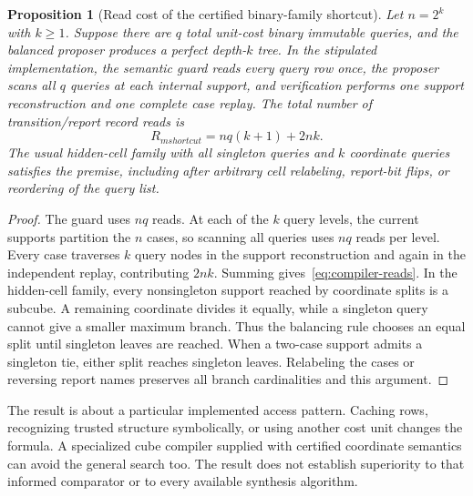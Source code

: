 \documentclass[11pt,letterpaper]{article}
\theoremstyle{plain}
\newtheorem{proposition}[theorem]{Proposition}
\theoremstyle{definition}
\begin{document}
\begin{proposition}[Read cost of the certified binary-family shortcut]\label{prop:compiler-work}
Let $n=2^k$ with $k\geq1$. Suppose there are $q$ total unit-cost binary immutable queries, and the balanced proposer produces a perfect depth-$k$ tree. In the stipulated implementation, the semantic guard reads every query row once, the proposer scans all $q$ queries at each internal support, and verification performs one support reconstruction and one complete case replay. The total number of transition/report record reads is
\begin{equation}\label{eq:compiler-reads}
R_{
m shortcut}=nq(k+1)+2nk.
\end{equation}
The usual hidden-cell family with all singleton queries and $k$ coordinate queries satisfies the premise, including after arbitrary cell relabeling, report-bit flips, or reordering of the query list.
\end{proposition}
\begin{proof}
The guard uses $nq$ reads. At each of the $k$ query levels, the current supports partition the $n$ cases, so scanning all queries uses $nq$ reads per level. Every case traverses $k$ query nodes in the support reconstruction and again in the independent replay, contributing $2nk$. Summing gives~\eqref{eq:compiler-reads}. In the hidden-cell family, every nonsingleton support reached by coordinate splits is a subcube. A remaining coordinate divides it equally, while a singleton query cannot give a smaller maximum branch. Thus the balancing rule chooses an equal split until singleton leaves are reached. When a two-case support admits a singleton tie, either split reaches singleton leaves. Relabeling the cases or reversing report names preserves all branch cardinalities and this argument.
\end{proof}

The result is about a particular implemented access pattern. Caching rows, recognizing trusted structure symbolically, or using another cost unit changes the formula. A specialized cube compiler supplied with certified coordinate semantics can avoid the general search too. The result does not establish superiority to that informed comparator or to every available synthesis algorithm.
\end{document}
